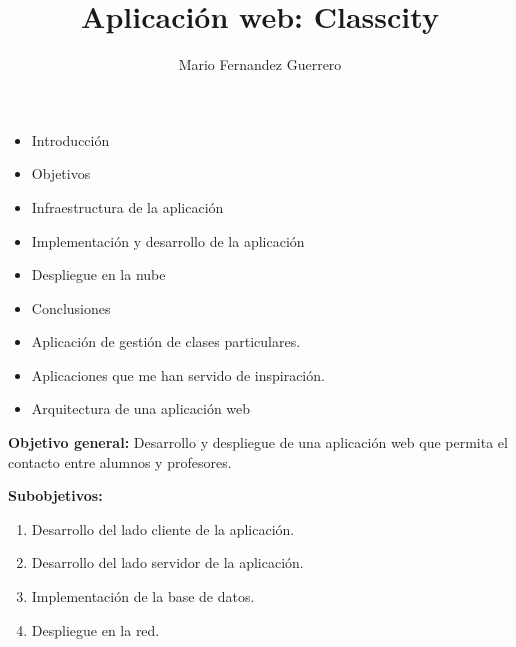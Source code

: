 \documentclass[notes,slidesec,a4]{seminar}
\title{Aplicación web: Classcity}
\author{Mario Fernandez Guerrero}
\begin{document}
\maketitle



\begin{hslide}
\begin{itemize}
\item Introducción
\item Objetivos
\item Infraestructura de la aplicación
\item Implementación y desarrollo de la aplicación
\item Despliegue en la nube
\item Conclusiones
\end{itemize}
\end{hslide}

\begin{hslide}
\begin{itemize}
\item Aplicación de gestión de clases particulares.
\item Aplicaciones que me han servido de inspiración.
\item Arquitectura de una aplicación web
\end{itemize}
\end{hslide}

\begin{hslide}
\textbf{Objetivo general: } Desarrollo y despliegue de una aplicación web que permita el contacto entre alumnos y profesores.

\textbf{Subobjetivos: }
\begin{enumerate}
\item Desarrollo del lado cliente de la aplicación.
\item Desarrollo del lado servidor de la aplicación.
\item Implementación de la base de datos.
\item Despliegue en la red.
\end{enumerate}
\end{hslide}
\end{document}

